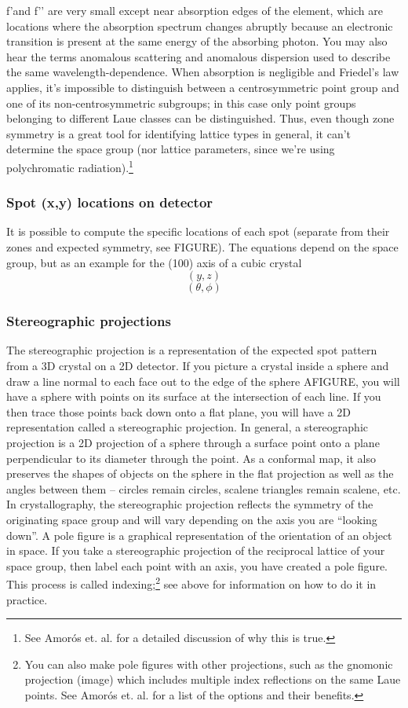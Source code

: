 f'and f’’ are very small except near absorption edges of the element, which are locations where the absorption spectrum changes abruptly because an electronic transition is present at the same energy of the absorbing photon. You may also hear the terms anomalous scattering and anomalous dispersion used to describe the same wavelength-dependence.
When absorption is negligible and Friedel's law applies, it’s impossible to distinguish between a centrosymmetric point group and one of its non-centrosymmetric subgroups; in this case only point groups belonging to different Laue classes can be distinguished. Thus, even though zone symmetry is a great tool for identifying lattice types in general, it can’t determine the space group (nor lattice parameters, since we’re using polychromatic radiation).\footnote{See Amorós et. al. for a detailed discussion of why this is true.}
\subsubsection{Spot (x,y) locations on detector}
It is possible to compute the specific locations of each spot (separate from their zones and expected symmetry, see FIGURE). The equations depend on the space group, but as an example for the (100) axis of a cubic crystal 
\begin{equation}
    (y,z)
    \label{CubicSpotYZ}
\end{equation}
\begin{equation}
    (\theta,\phi)
    \label{CubicSpotAng}
\end{equation}
\subsubsection{Stereographic projections}
The stereographic projection is a representation of the expected spot pattern from a 3D crystal on a 2D detector. If you picture a crystal inside a sphere and draw a line normal to each face out to the edge of the sphere AFIGURE, you will have a sphere with points on its surface at the intersection of each line. If you then trace those points back down onto a flat plane, you will have a 2D representation called a stereographic projection. In general, a stereographic projection is a 2D projection of a sphere through a surface point onto a plane perpendicular to its diameter through the point. As a conformal map, it also preserves the shapes of objects on the sphere in the flat projection as well as the angles between them – circles remain circles, scalene triangles remain scalene, etc. In crystallography, the stereographic projection reflects the symmetry of the originating space group and will vary depending on the axis you are “looking down”.
A pole figure is a graphical representation of the orientation of an object in space. If you take a stereographic projection of the reciprocal lattice of your space group, then label each point with an axis, you have created a pole figure. This process is called indexing;\footnote{You can also make pole figures with other projections, such as the gnomonic projection (image) which includes multiple index reflections on the same Laue points. See Amorós et. al. for a list of the options and their benefits.} see above for information on how to do it in practice.
